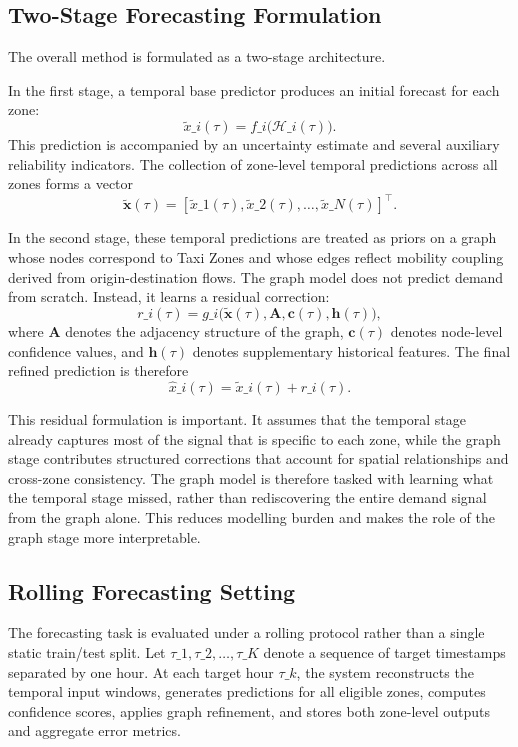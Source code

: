 \documentclass[12pt,a4paper]{report}
\begin{document}
\subsection{Two-Stage Forecasting Formulation}

The overall method is formulated as a two-stage architecture.

In the first stage, a temporal base predictor produces an initial forecast for each zone:
\[
\tilde{x}\_i(\tau) = f\_i\big(\mathcal{H}\_i(\tau)\big).
\]
This prediction is accompanied by an uncertainty estimate and several auxiliary reliability indicators. The collection of zone-level temporal predictions across all zones forms a vector
\[
\tilde{\mathbf{x}}(\tau) =
[\tilde{x}\_1(\tau), \tilde{x}\_2(\tau), \dots, \tilde{x}\_N(\tau)]^\top.
\]

In the second stage, these temporal predictions are treated as priors on a graph whose nodes correspond to Taxi Zones and whose edges reflect mobility coupling derived from origin-destination flows. The graph model does not predict demand from scratch. Instead, it learns a residual correction:
\[
r\_i(\tau) = g\_i\big(\tilde{\mathbf{x}}(\tau), \mathbf{A}, \mathbf{c}(\tau), \mathbf{h}(\tau)\big),
\]
where \(\mathbf{A}\) denotes the adjacency structure of the graph, \(\mathbf{c}(\tau)\) denotes node-level confidence values, and \(\mathbf{h}(\tau)\) denotes supplementary historical features. The final refined prediction is therefore
\[
\hat{x}\_i(\tau) = \tilde{x}\_i(\tau) + r\_i(\tau).
\]

This residual formulation is important. It assumes that the temporal stage already captures most of the signal that is specific to each zone, while the graph stage contributes structured corrections that account for spatial relationships and cross-zone consistency. The graph model is therefore tasked with learning what the temporal stage missed, rather than rediscovering the entire demand signal from the graph alone. This reduces modelling burden and makes the role of the graph stage more interpretable.

\subsection{Rolling Forecasting Setting}

The forecasting task is evaluated under a rolling protocol rather than a single static train/test split. Let \(\tau\_1, \tau\_2, \dots, \tau\_K\) denote a sequence of target timestamps separated by one hour. At each target hour \(\tau\_k\), the system reconstructs the temporal input windows, generates predictions for all eligible zones, computes confidence scores, applies graph refinement, and stores both zone-level outputs and aggregate error metrics.
\end{document}
